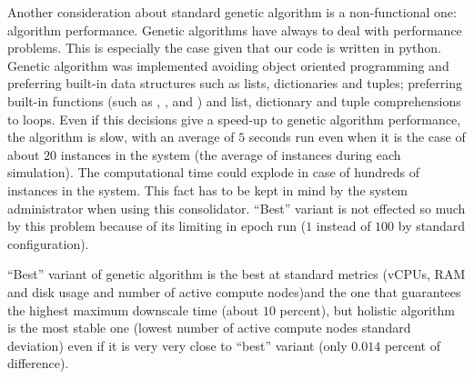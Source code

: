 Another consideration about standard genetic algorithm is a non-functional one: algorithm performance. Genetic algorithms have always to deal with performance problems. This is especially the case given that our code is written in python. Genetic algorithm was implemented avoiding object oriented programming and preferring built-in data structures such as lists, dictionaries and tuples; preferring built-in functions (such as , ,  and ) and list, dictionary and tuple comprehensions to  loops. Even if this decisions give a speed-up to genetic algorithm performance, the algorithm is slow, with an average of $5$ seconds run even when it is the case of about $20$ instances in the system (the average of instances during each simulation). The computational time could explode in case of hundreds of instances in the system. This fact has to be kept in mind by the system administrator when using this consolidator. ``Best'' variant is not effected so much by this problem because of its limiting in epoch run ($1$ instead of $100$ by standard configuration).

``Best'' variant of genetic algorithm is the best at standard metrics (vCPUs, RAM and disk usage and number of active compute nodes)and the one that guarantees the highest maximum downscale time (about $10$ percent), but holistic algorithm is the most stable one (lowest number of active compute nodes standard deviation) even if it is very very close to ``best'' variant (only $0.014$ percent of difference).
